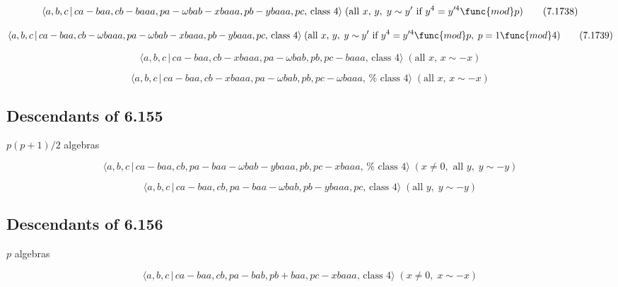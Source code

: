 \documentclass[10pt]{article}
\begin{document}
\begin{equation}
\langle a,b,c\,|\,ca-baa,cb-baaa,pa-\omega bab-xbaaa,pb-ybaaa,pc,\,\text{%
class }4\rangle \;(\text{all }x,\,y,\;y\sim y^{\prime }\text{ if }%
y^{4}=y^{\prime 4}\func{mod}p)  \tag{7.1738}
\end{equation}

\begin{equation}
\langle a,b,c\,|\,ca-baa,cb-\omega baaa,pa-\omega bab-xbaaa,pb-ybaaa,pc,\,%
\text{class }4\rangle \;(\text{all }x,\,y,\;y\sim y^{\prime }\text{ if }%
y^{4}=y^{\prime 4}\func{mod}p,\;p=1\func{mod}4)  \tag{7.1739}
\end{equation}

\begin{equation}
\langle a,b,c\,|\,ca-baa,cb-xbaaa,pa-\omega bab,pb,pc-baaa,\,\text{class }%
4\rangle \;(\text{all }x,\,x\sim -x)  \tag{7.1740}
\end{equation}

\begin{equation}
\langle a,b,c\,|\,ca-baa,cb-xbaaa,pa-\omega bab,pb,pc-\omega baaa,\,\text{%
class }4\rangle \;(\text{all }x,\,x\sim -x)  \tag{7.1741}
\end{equation}

\subsection{Descendants of 6.155}

$p(p+1)/2$ algebras

\begin{equation}
\langle a,b,c\,|\,ca-baa,cb,pa-baa-\omega bab-ybaaa,pb,pc-xbaaa,\,\text{%
class }4\rangle \;(x\neq 0,\text{ all }y,\;y\sim -y)  \tag{7.1742}
\end{equation}

\begin{equation}
\langle a,b,c\,|\,ca-baa,cb,pa-baa-\omega bab,pb-ybaaa,pc,\,\text{class }%
4\rangle \;(\text{all }y,\;y\sim -y)  \tag{7.1743}
\end{equation}

\subsection{Descendants of 6.156}

$p$ algebras

\begin{equation}
\langle a,b,c\,|\,ca-baa,cb,pa-bab,pb+baa,pc-xbaaa,\,\text{class }4\rangle
\;(x\neq 0,\;x\sim -x)  \tag{7.1744}
\end{equation}
\end{document}
